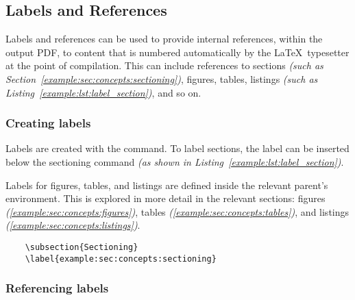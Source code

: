 \subsection{Labels and References}
Labels and references can be used to provide internal references, within the output PDF, to content that is numbered automatically by the \LaTeX\ typesetter at the point of compilation. This can include references to sections \textit{(such as Section~\ref{example:sec:concepts:sectioning})}, figures, tables, listings \textit{(such as Listing~\ref{example:lst:label_section})}, and so on.

\subsubsection*{Creating labels}
Labels are created with the  command. To label sections, the label can be inserted below the sectioning command \textit{(as shown in Listing~\ref{example:lst:label_section})}.

Labels for figures, tables, and listings are defined inside the relevant parent's environment. This is explored in more detail in the relevant sections: figures \textit{(\ref{example:sec:concepts:figures})}, tables \textit{(\ref{example:sec:concepts:tables})}, and listings \textit{(\ref{example:sec:concepts:listings})}.


\begin{listing}[H]
  \captionsetup{skip=\skiplistingcaptionlen}
  \begin{verbatim}
    \subsection{Sectioning}
    \label{example:sec:concepts:sectioning}
  \end{verbatim}
  \caption{\texttt{\textbackslash label} sectioning command example}
  \label{example:lst:label_section}
\end{listing}

\subsubsection*{Referencing labels}
